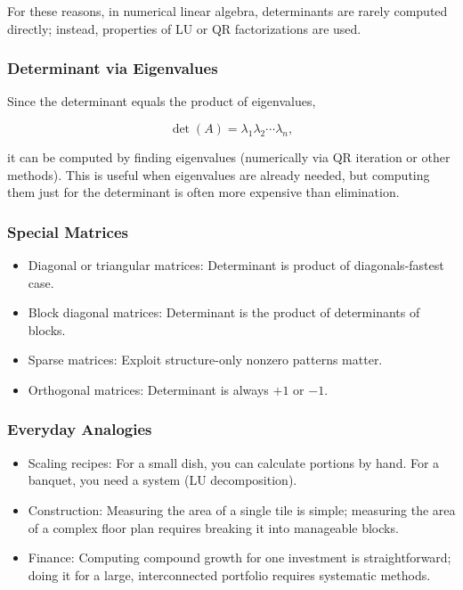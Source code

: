 \documentclass[
  letterpaper,
  DIV=11,
  numbers=noendperiod]{scrreprt}
\providecommand{\tightlist}{%
  \setlength{\itemsep}{0pt}\setlength{\parskip}{0pt}}
\begin{document}
For these reasons, in numerical linear algebra, determinants are rarely
computed directly; instead, properties of LU or QR factorizations are
used.

\subsubsection{Determinant via
Eigenvalues}\label{determinant-via-eigenvalues}

Since the determinant equals the product of eigenvalues,

\[
\det(A) = \lambda_1 \lambda_2 \cdots \lambda_n,
\]

it can be computed by finding eigenvalues (numerically via QR iteration
or other methods). This is useful when eigenvalues are already needed,
but computing them just for the determinant is often more expensive than
elimination.

\subsubsection{Special Matrices}\label{special-matrices}

\begin{itemize}
\tightlist
\item
  Diagonal or triangular matrices: Determinant is product of
  diagonals-fastest case.
\item
  Block diagonal matrices: Determinant is the product of determinants of
  blocks.
\item
  Sparse matrices: Exploit structure-only nonzero patterns matter.
\item
  Orthogonal matrices: Determinant is always \(+1\) or \(-1\).
\end{itemize}

\subsubsection{Everyday Analogies}\label{everyday-analogies-56}

\begin{itemize}
\tightlist
\item
  Scaling recipes: For a small dish, you can calculate portions by hand.
  For a banquet, you need a system (LU decomposition).
\item
  Construction: Measuring the area of a single tile is simple; measuring
  the area of a complex floor plan requires breaking it into manageable
  blocks.
\item
  Finance: Computing compound growth for one investment is
  straightforward; doing it for a large, interconnected portfolio
  requires systematic methods.
\end{itemize}
\end{document}
